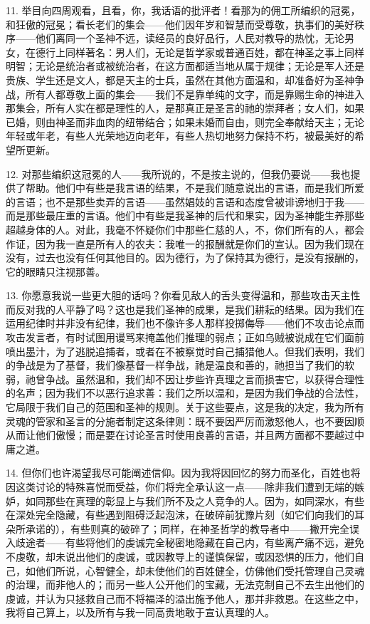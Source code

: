 11. 举目向四周观看，且看，你，我话语的批评者！看那为的佣工所编织的冠冕，和狂傲的冠冕；看长老们的集会——他们因年岁和智慧而受尊敬，执事们的美好秩序——他们离同一个圣神不远，读经员的良好品行，人民对教导的热忱，无论男女，在德行上同样著名：男人们，无论是哲学家或普通百姓，都在神圣之事上同样明智；无论是统治者或被统治者，在这方面都适当地从属于规律；无论是军人还是贵族、学生还是文人，都是天主的士兵，虽然在其他方面温和，却准备好为圣神争战，所有人都尊敬上面的集会——我们不是靠单纯的文字，而是靠赐生命的神进入那集会，所有人实在都是理性的人，是那真正是圣言的祂的崇拜者；女人们，如果已婚，则由神圣而非血肉的纽带结合；如果未婚而自由，则完全奉献给天主；无论年轻或年老，有些人光荣地迈向老年，有些人热切地努力保持不朽，被最美好的希望所更新。\par

12. 对那些编织这冠冕的人——我所说的，不是按主说的，但我仍要说——我也提供了帮助。他们中有些是我言语的结果，不是我们随意说出的言语，而是我们所爱的言语；也不是那些卖弄的言语——虽然娼妓的言语和态度曾被诽谤地归于我——而是那些最庄重的言语。他们中有些是我圣神的后代和果实，因为圣神能生养那些超越身体的人。对此，我毫不怀疑你们中那些仁慈的人，不，你们所有的人，都会作证，因为我一直是所有人的农夫：我唯一的报酬就是你们的宣认。因为我们现在没有，过去也没有任何其他目的。因为德行，为了保持其为德行，是没有报酬的，它的眼睛只注视那善。\par

13. 你愿意我说一些更大胆的话吗？你看见敌人的舌头变得温和，那些攻击天主性而反对我的人平静了吗？这也是我们圣神的成果，是我们耕耘的结果。因为我们在运用纪律时并非没有纪律，我们也不像许多人那样投掷侮辱——他们不攻击论点而攻击发言者，有时试图用谩骂来掩盖他们推理的弱点；正如乌贼被说成在它们面前喷出墨汁，为了逃脱追捕者，或者在不被察觉时自己捕猎他人。但我们表明，我们的争战是为了基督，我们像基督一样争战，祂是温良和善的，祂担当了我们的软弱，祂曾争战。虽然温和，我们却不因让步些许真理之言而损害它，以获得合理性的名声；因为我们不以恶行追求善：我们之所以温和，是因为我们争战的合法性，它局限于我们自己的范围和圣神的规则。关于这些要点，这是我的决定，我为所有灵魂的管家和圣言的分施者制定这条律则：既不要因严厉而激怒他人，也不要因顺从而让他们傲慢；而是要在讨论圣言时使用良善的言语，并且两方面都不要越过中庸之道。\par

14. 但你们也许渴望我尽可能阐述信仰。因为我将因回忆的努力而圣化，百姓也将因这类讨论的特殊喜悦而受益，你们将完全承认这一点——除非我们遭到无端的嫉妒，如同那些在真理的彰显上与我们所不及之人竞争的人。因为，如同深水，有些在深处完全隐藏，有些遇到阻碍泛起泡沫，在破碎前犹豫片刻（如它们向我们的耳朵所承诺的），有些则真的破碎了；同样，在神圣哲学的教导者中——撇开完全误入歧途者——有些将他们的虔诚完全秘密地隐藏在自己内，有些离产痛不远，避免不虔敬，却未说出他们的虔诚，或因教导上的谨慎保留，或因恐惧的压力，他们自己，如他们所说，心智健全，却未使他们的百姓健全，仿佛他们受托管理自己灵魂的治理，而非他人的；而另一些人公开他们的宝藏，无法克制自己不去生出他们的虔诚，并认为只拯救自己而不将福泽的溢出施予他人，那并非救恩。在这些之中，我将自己算上，以及所有与我一同高贵地敢于宣认真理的人。\par

